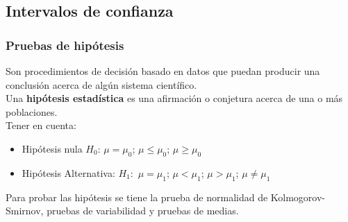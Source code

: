 \documentclass[12pt,hidelinks]{article}
\begin{document}
    \subsection{Intervalos de confianza}
        \subsubsection{Pruebas de hipótesis}
            Son procedimientos de decisión basado en datos que puedan producir una conclusión acerca de algún sistema científico.\\
            Una \textbf{hipótesis estadística} es una afirmación o conjetura acerca de una o más poblaciones.\\
            Tener en cuenta:
            \begin{itemize}
                \item Hipótesis nula  $H_0$: $\mu=\mu_0$; $\mu\leq\mu_0$; $\mu\geq\mu_0$
                \item Hipótesis Alternativa: $H_1:$ $\mu=\mu_1$; $\mu<\mu_1$; $\mu>\mu_1$; $\mu\neq\mu_1$
            \end{itemize}
            Para probar las hipótesis se tiene la prueba de normalidad de Kolmogorov-Smirnov, pruebas de variabilidad y pruebas de medias.
\end{document}
